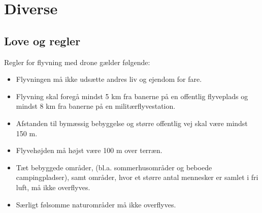 \documentclass[Main]{subfiles}
\begin{document}
\chapter{Diverse}
\section{Love og regler}
Regler for flyvning med drone gælder følgende:

\begin{itemize}
\item Flyvningen må ikke udsætte andres liv og ejendom for fare\cite[s. 1]{Lov1}.
\item Flyvning skal foregå mindst 5 km fra banerne på en offentlig flyveplads og mindst 8 km fra banerne på en militærflyvestation\cite[s. 1]{Lov1}.
\item Afstanden til bymæssig bebyggelse og større offentlig vej skal være mindst 150 m\cite[s. 1]{Lov1}.
\item Flyvehøjden må højst være 100 m over terræn\cite[s. 2]{Lov1}.
\item Tæt bebyggede områder, (bl.a. sommerhusområder og beboede campingpladser), samt områder, hvor et større antal mennesker er samlet i fri luft, må ikke overflyves\cite[s. 2]{Lov1}.
\item Særligt følsomme naturområder må ikke overflyves\cite[s. 2]{Lov1}.
\end{itemize}
 
\end{document}
